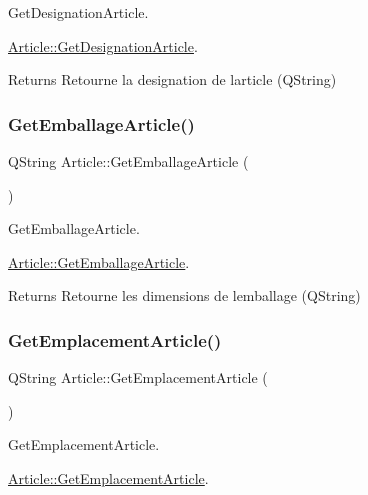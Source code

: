 Get\+Designation\+Article. 

\mbox{\hyperlink{class_article_af9b0da3a793b4a0dcfe8e97b24ac4f79}{Article\+::\+Get\+Designation\+Article}}.

\begin{DoxyReturn}{Returns}
Retourne la designation de l\textquotesingle{}article (Q\+String)


\end{DoxyReturn}
\mbox{\label{class_article_aa086c1a1aa8af81fb34c9a20b05d0155}} 
\subsubsection{\texorpdfstring{Get\+Emballage\+Article()}{GetEmballageArticle()}}
{\footnotesize\ttfamily Q\+String Article\+::\+Get\+Emballage\+Article (\begin{DoxyParamCaption}{ }\end{DoxyParamCaption})}



Get\+Emballage\+Article. 

\mbox{\hyperlink{class_article_aa086c1a1aa8af81fb34c9a20b05d0155}{Article\+::\+Get\+Emballage\+Article}}.

\begin{DoxyReturn}{Returns}
Retourne les dimensions de l\textquotesingle{}emballage (Q\+String)


\end{DoxyReturn}
\mbox{\label{class_article_aca48728ecc7862026b40b18db12591fa}} 
\subsubsection{\texorpdfstring{Get\+Emplacement\+Article()}{GetEmplacementArticle()}}
{\footnotesize\ttfamily Q\+String Article\+::\+Get\+Emplacement\+Article (\begin{DoxyParamCaption}{ }\end{DoxyParamCaption})}



Get\+Emplacement\+Article. 

\mbox{\hyperlink{class_article_aca48728ecc7862026b40b18db12591fa}{Article\+::\+Get\+Emplacement\+Article}}.

